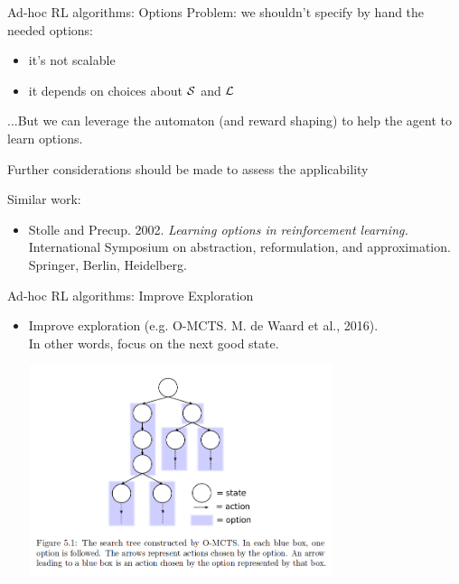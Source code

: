 \documentclass{beamer}
\begin{document}
\begin{frame}{Ad-hoc RL algorithms: Options}
	Problem: we shouldn't specify by hand the needed options:
	\begin{itemize}
		\item it's not scalable
		\item it depends on choices about $\S$ and $\L$
	\end{itemize}
	
	\vspace{0.3cm}
	...But we can leverage the automaton (and reward shaping) to help the agent to learn options.
	
	Further considerations should be made to assess the applicability
	
	\vspace{0.3cm}
	Similar work:
	\begin{itemize}
		\item Stolle and Precup. 2002. \emph{Learning options in reinforcement learning.} International Symposium on abstraction, reformulation, and approximation. Springer, Berlin, Heidelberg.
	\end{itemize}
	
\end{frame}

\begin{frame}{Ad-hoc RL algorithms: Improve Exploration}
	\begin{itemize}
		\item Improve exploration (e.g. O-MCTS. M. de Waard et al., 2016).\\ In other words, focus on the next good \DFA state.
			
			\begin{center}
			\includegraphics[width=0.7\textwidth]{images/o-mcts}
			\end{center}
			
	\end{itemize}
\end{frame}
\end{document}

